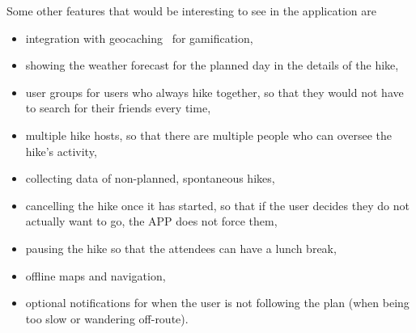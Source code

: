 Some other features that would be interesting to see in the application are
\begin{itemize}
    \item integration with geocaching~\cite{geocaching} for gamification,
    \item showing the weather forecast for the planned day in the details of the hike,
    \item user groups for users who always hike together, so that they would not have to search for their friends every time,
    \item multiple hike hosts, so that there are multiple people who can oversee the hike's activity,
    \item collecting data of non-planned, spontaneous hikes,
    \item cancelling the hike once it has started, so that if the user decides they do not actually want to go, the APP does not force them,
    \item pausing the hike so that the attendees can have a lunch break,
    \item offline maps and navigation,
    \item optional notifications for when the user is not following the plan (when being too slow or wandering off-route).
\end{itemize}

